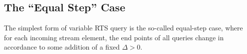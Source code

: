 \subsection{The ``Equal Step'' Case}

The simplest form of variable RTS query is the so-called equal-step case, where for each incoming stream element, the end points of all queries change in accordance to some addition of a fixed $\Delta >0$.
